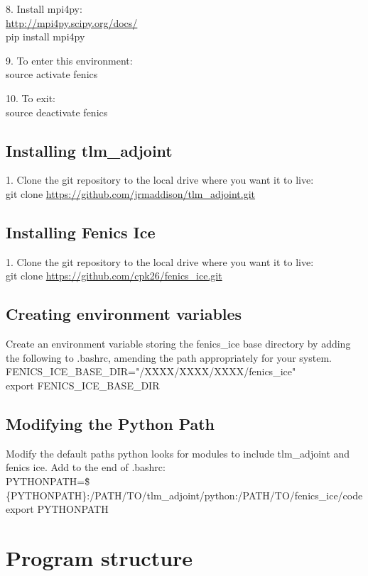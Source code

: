 \documentclass[11pt, reqno, nocenter]{article}
\begin{document}
8. Install mpi4py: \\
\url{http://mpi4py.scipy.org/docs/} \\
pip install mpi4py

9. To enter this environment: \\
source activate fenics

10. To exit: \\
source deactivate fenics

\subsection{Installing tlm\_adjoint}

1. Clone the git repository to the local drive where you want it to live:\\
git clone \url{https://github.com/jrmaddison/tlm_adjoint.git}

\subsection{Installing Fenics Ice}

1. Clone the git repository to the local drive where you want it to live: \\
git clone \url{https://github.com/cpk26/fenics_ice.git}


\subsection{Creating environment variables}
Create an environment variable storing the fenics\_ice base directory by adding the following to .bashrc, amending the path appropriately for your system. \\
FENICS\_ICE\_BASE\_DIR="/XXXX/XXXX/XXXX/fenics\_ice" \\                                            
export FENICS\_ICE\_BASE\_DIR   


\subsection{Modifying the Python Path}

Modify the default paths python looks for modules to include tlm\_adjoint and fenics ice. Add to the end of .bashrc: \\
PYTHONPATH=\"\$\{PYTHONPATH\}:/PATH/TO/tlm\_adjoint/python:/PATH/TO/fenics\_ice/code\" \\
export PYTHONPATH

\section{Program structure}
\end{document}
